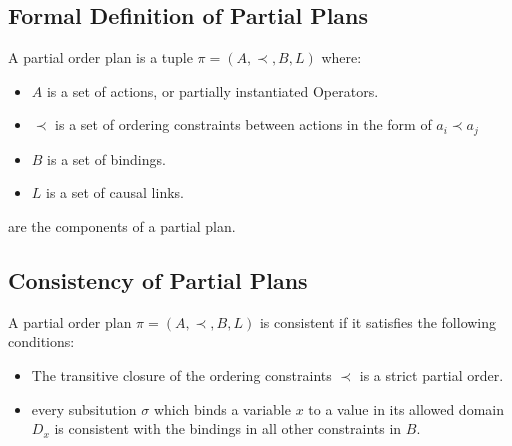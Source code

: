 \subsection{Formal Definition of Partial Plans}
A partial order plan is a tuple $\pi = (A, \prec, B, L)$ where:
\begin{itemize}
  \item $A$ is a set of actions, or partially instantiated Operators.
  \item $\prec$ is a set of ordering constraints between actions in the form of $a_i \prec a_j$
  \item $B$ is a set of bindings.
  \item $L$ is a set of causal links.
\end{itemize}
are the components of a partial plan.



\subsection{Consistency of Partial Plans}
A partial order plan $\pi = (A, \prec, B, L)$ is consistent if it satisfies the following conditions:
\begin{itemize}
  \item The transitive closure of the ordering constraints $\prec$ is a strict partial order.
  \item every subsitution $\sigma $ which binds a variable $x$ to a value in its allowed domain $D_x$ is consistent with the bindings in all other constraints in $B$.
\end{itemize}